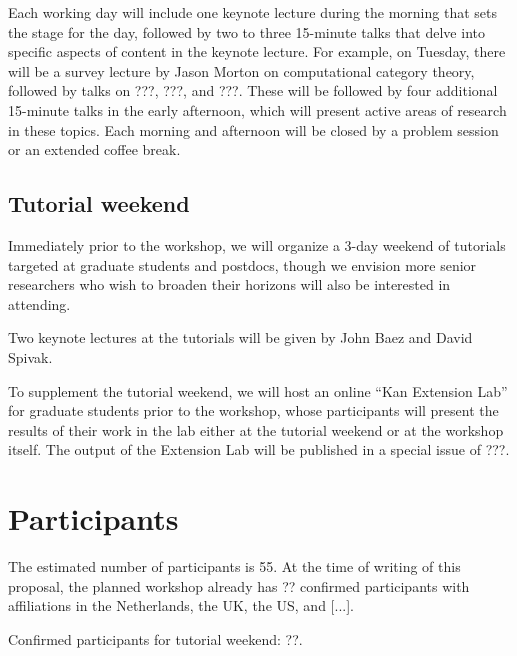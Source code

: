 \documentclass{article}
\newcommand{\redout}[1]{{\color{red}#1}}
\begin{document}
Each working day will include one keynote lecture during the morning that sets the stage for the day, followed by two to three 15-minute talks that delve into specific aspects of content in the keynote lecture. For example, on Tuesday, there will be a survey lecture by \redout{Jason Morton} on computational category theory, followed by talks on \redout{???}, \redout{???}, and \redout{???}. These will be followed by four additional 15-minute talks in the early afternoon, which will present active areas of research in these topics. Each morning and afternoon will be closed by a problem session or an extended coffee break. 


\subsection{Tutorial weekend}
Immediately prior to the workshop, we will organize a 3-day weekend of tutorials targeted at graduate students and postdocs, though we envision more senior researchers who wish to broaden their horizons will also be interested in attending.

Two keynote lectures at the tutorials will be given by \redout{John Baez and David Spivak}.

To supplement the tutorial weekend, we will host an online ``Kan Extension Lab'' for graduate students prior to the workshop, whose participants will present the results of their work in the lab either at the tutorial weekend or at the workshop itself. The output of the Extension Lab will be published in a special issue of \redout{???}.

\section{Participants}
The estimated number of participants is 55. At the time of writing of this proposal, the planned workshop already has ?? confirmed participants with affiliations in the Netherlands, the UK, the US, and [...].

Confirmed participants for tutorial weekend: ??. 
\end{document}
